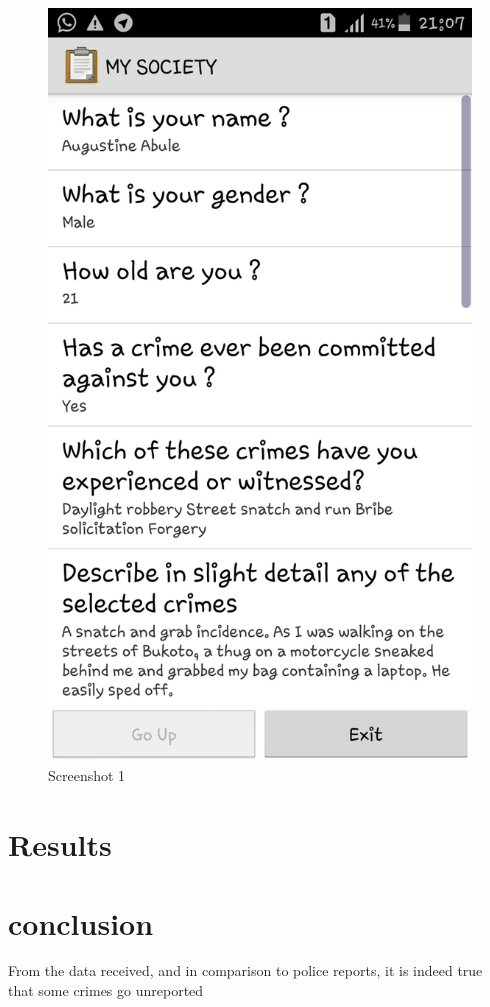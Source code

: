 \documentclass{article}
\begin{document}
\begin{figure}
	\includegraphics[width=\linewidth]{1.png}
	\caption{Screenshot 1}
	



\end{figure}

\section{Results}


\section{conclusion}

From the data received, and in comparison to police reports, it is indeed true that some crimes go unreported
\end{document}
